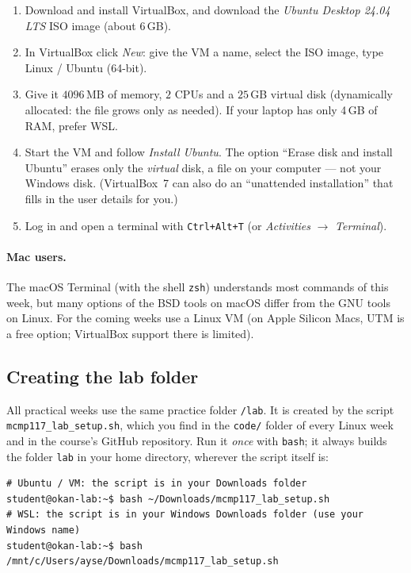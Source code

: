 \documentclass[11pt,a4paper]{article}
\newcommand{\cmd}[1]{\texttt{#1}}
\begin{document}
\begin{enumerate}[leftmargin=1.4em]
  \item Download and install VirtualBox, and download the \emph{Ubuntu Desktop 24.04 LTS} ISO image (about 6\,GB).
  \item In VirtualBox click \emph{New}: give the VM a name, select the ISO image, type Linux / Ubuntu (64-bit).
  \item Give it $4096$\,MB of memory, $2$ CPUs and a $25$\,GB virtual disk (dynamically allocated: the file grows only as needed). If your laptop has only 4\,GB of RAM, prefer WSL.
  \item Start the VM and follow \emph{Install Ubuntu}. The option ``Erase disk and install Ubuntu'' erases only the \emph{virtual} disk, a file on your computer --- not your Windows disk. (VirtualBox~7 can also do an ``unattended installation'' that fills in the user details for you.)
  \item Log in and open a terminal with \texttt{Ctrl+Alt+T} (or \emph{Activities} $\to$ \emph{Terminal}).
\end{enumerate}

\paragraph{Mac users.} The macOS Terminal (with the shell \cmd{zsh}) understands most commands of this week, but many options of the BSD tools on macOS differ from the GNU tools on Linux. For the coming weeks use a Linux VM (on Apple Silicon Macs, UTM is a free option; VirtualBox support there is limited).

\subsection{Creating the lab folder}
\label{sec:labsetup}

All practical weeks use the same practice folder \texttt{\tl/lab}. It is created by the script \texttt{mcmp117\_lab\_setup.sh}, which you find in the \texttt{code/} folder of every Linux week and in the course's GitHub repository. Run it \emph{once} with \cmd{bash}; it always builds the folder \texttt{lab} in your home directory, wherever the script itself is:

\begin{lstlisting}[style=term]
# Ubuntu / VM: the script is in your Downloads folder
student@okan-lab:~$ bash ~/Downloads/mcmp117_lab_setup.sh
# WSL: the script is in your Windows Downloads folder (use your Windows name)
student@okan-lab:~$ bash /mnt/c/Users/ayse/Downloads/mcmp117_lab_setup.sh
\end{lstlisting}
\end{document}
